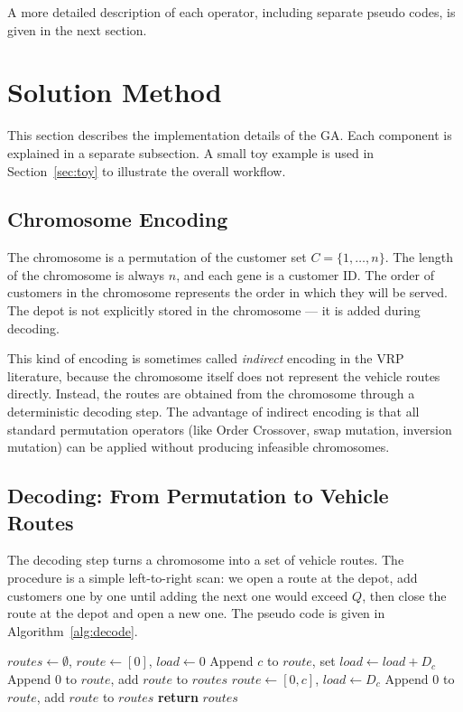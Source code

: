 \documentclass [a4paper, 11pt, titlepage] {article}
\begin{document}
A more detailed description of each operator, including separate pseudo codes, is given in the next section.

\section{Solution Method}
\label{sec:solution}

This section describes the implementation details of the GA. Each component is explained in a separate subsection. A small toy example is used in Section~\ref{sec:toy} to illustrate the overall workflow.

\subsection{Chromosome Encoding}
\label{sec:encoding}

The chromosome is a permutation of the customer set $C = \{1, \ldots, n\}$. The length of the chromosome is always $n$, and each gene is a customer ID. The order of customers in the chromosome represents the order in which they will be served. The depot is not explicitly stored in the chromosome --- it is added during decoding.

This kind of encoding is sometimes called \emph{indirect} encoding in the VRP literature, because the chromosome itself does not represent the vehicle routes directly. Instead, the routes are obtained from the chromosome through a deterministic decoding step. The advantage of indirect encoding is that all standard permutation operators (like Order Crossover, swap mutation, inversion mutation) can be applied without producing infeasible chromosomes.

\subsection{Decoding: From Permutation to Vehicle Routes}
\label{sec:decoding}

The decoding step turns a chromosome into a set of vehicle routes. The procedure is a simple left-to-right scan: we open a route at the depot, add customers one by one until adding the next one would exceed $Q$, then close the route at the depot and open a new one. The pseudo code is given in Algorithm~\ref{alg:decode}.

\begin{algorithm}[H]
\caption{Permutation Decoder}
\label{alg:decode}
\begin{algorithmic}[1]
    \State $routes \gets \emptyset$, $route \gets [0]$, $load \gets 0$
            \State Append $c$ to $route$, set $load \gets load + D_c$
        \Else
            \State Append $0$ to $route$, add $route$ to $routes$
            \State $route \gets [0, c]$, $load \gets D_c$
        \EndIf
    \EndFor
    \State Append $0$ to $route$, add $route$ to $routes$
    \State \textbf{return} $routes$
\end{algorithmic}
\end{algorithm}
\end{document}
